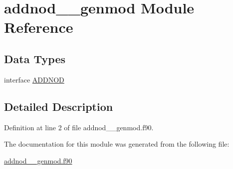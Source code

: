 \hypertarget{classaddnod____genmod}{\section{addnod\+\_\+\+\_\+genmod Module Reference}
\label{classaddnod____genmod}
}
\subsection*{Data Types}
\begin{DoxyCompactItemize}
\item 
interface \hyperlink{interfaceaddnod____genmod_1_1ADDNOD}{A\+D\+D\+N\+O\+D}
\end{DoxyCompactItemize}


\subsection{Detailed Description}


Definition at line 2 of file addnod\+\_\+\+\_\+genmod.\+f90.



The documentation for this module was generated from the following file\+:\begin{DoxyCompactItemize}
\item 
\hyperlink{addnod____genmod_8f90}{addnod\+\_\+\+\_\+genmod.\+f90}\end{DoxyCompactItemize}
